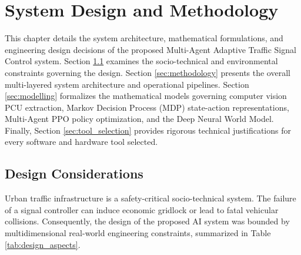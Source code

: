\documentclass[12pt,a4paper,oneside]{report}
\begin{document}
\chapter{System Design and Methodology}
\label{ch:system_design}

This chapter details the system architecture, mathematical formulations, and engineering design decisions of the proposed Multi-Agent Adaptive Traffic Signal Control system. Section \ref{sec:design_considerations} examines the socio-technical and environmental constraints governing the design. Section \ref{sec:methodology} presents the overall multi-layered system architecture and operational pipelines. Section \ref{sec:modelling} formalizes the mathematical models governing computer vision PCU extraction, Markov Decision Process (MDP) state-action representations, Multi-Agent PPO policy optimization, and the Deep Neural World Model. Finally, Section \ref{sec:tool_selection} provides rigorous technical justifications for every software and hardware tool selected.

\section{Design Considerations}
\label{sec:design_considerations}

Urban traffic infrastructure is a safety-critical socio-technical system. The failure of a signal controller can induce economic gridlock or lead to fatal vehicular collisions. Consequently, the design of the proposed AI system was bounded by multidimensional real-world engineering constraints, summarized in Table \ref{tab:design_aspects}.
\end{document}
